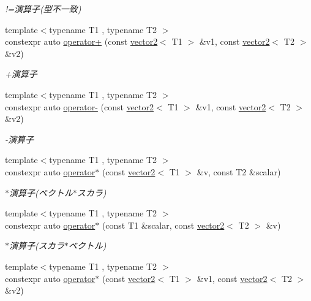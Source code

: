 \begin{DoxyCompactItemize}
\begin{DoxyCompactList}\small\item\em !=演算子(型不一致) \end{DoxyCompactList}\item 
{\footnotesize template$<$typename T1 , typename T2 $>$ }\\constexpr auto \mbox{\hyperlink{namespacesaki_a7c132b30fc5554123e166c29a5292607}{operator+}} (const \mbox{\hyperlink{classsaki_1_1vector2}{vector2}}$<$ T1 $>$ \&v1, const \mbox{\hyperlink{classsaki_1_1vector2}{vector2}}$<$ T2 $>$ \&v2)
\begin{DoxyCompactList}\small\item\em +演算子 \end{DoxyCompactList}\item 
{\footnotesize template$<$typename T1 , typename T2 $>$ }\\constexpr auto \mbox{\hyperlink{namespacesaki_ab08546185e6a03ba6496daf21d943799}{operator-\/}} (const \mbox{\hyperlink{classsaki_1_1vector2}{vector2}}$<$ T1 $>$ \&v1, const \mbox{\hyperlink{classsaki_1_1vector2}{vector2}}$<$ T2 $>$ \&v2)
\begin{DoxyCompactList}\small\item\em -\/演算子 \end{DoxyCompactList}\item 
{\footnotesize template$<$typename T1 , typename T2 $>$ }\\constexpr auto \mbox{\hyperlink{namespacesaki_af6d6668922b972ec01303867612e4783}{operator$\ast$}} (const \mbox{\hyperlink{classsaki_1_1vector2}{vector2}}$<$ T1 $>$ \&v, const T2 \&scalar)
\begin{DoxyCompactList}\small\item\em $\ast$演算子(ベクトル$\ast$スカラ) \end{DoxyCompactList}\item 
{\footnotesize template$<$typename T1 , typename T2 $>$ }\\constexpr auto \mbox{\hyperlink{namespacesaki_a7d5d04727e813b089aadf4b97247b64a}{operator$\ast$}} (const T1 \&scalar, const \mbox{\hyperlink{classsaki_1_1vector2}{vector2}}$<$ T2 $>$ \&v)
\begin{DoxyCompactList}\small\item\em $\ast$演算子(スカラ$\ast$ベクトル) \end{DoxyCompactList}\item 
{\footnotesize template$<$typename T1 , typename T2 $>$ }\\constexpr auto \mbox{\hyperlink{namespacesaki_a1db47b2e2e0826325ae66ee6216ba5fc}{operator$\ast$}} (const \mbox{\hyperlink{classsaki_1_1vector2}{vector2}}$<$ T1 $>$ \&v1, const \mbox{\hyperlink{classsaki_1_1vector2}{vector2}}$<$ T2 $>$ \&v2)

\end{DoxyCompactItemize}
